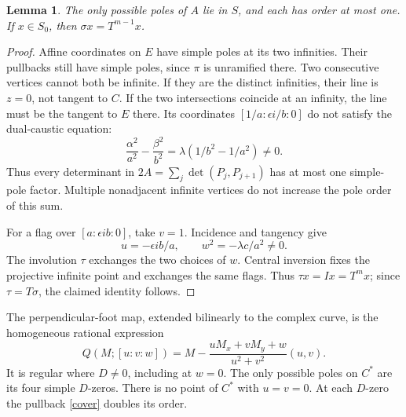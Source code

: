 \documentclass[11pt]{article}
\newtheorem{lemma}{Lemma}
\begin{document}
\begin{lemma}\label{polesA}
The only possible poles of \(A\) lie in \(S\), and each has order at
most one. If \(x\in S_0\), then
\(\sigma x=T^{m-1}x\).
\end{lemma}
\begin{proof}
Affine coordinates on \(E\) have simple poles at its two infinities.
Their pullbacks still have simple poles, since \(\pi\) is unramified
there. Two consecutive vertices cannot both be infinite. If they
are the distinct infinities, their line is \(z=0\), not tangent to \(C\).
If the two intersections coincide at an infinity, the line must be
the tangent to \(E\) there. Its coordinates
\([1/a:\epsilon i/b:0]\) do not satisfy the dual-caustic equation:
\[
 \frac{\alpha^2}{a^2}-\frac{\beta^2}{b^2}
 =\lambda(1/b^2-1/a^2)\ne0.
\]
Thus every determinant in \(2A=\sum_j\det(P_j,P_{j+1})\)
has at most one simple-pole factor. Multiple nonadjacent infinite
vertices do not increase the pole order of this sum.

For a flag over \([a:\epsilon ib:0]\), take \(v=1\).
Incidence and tangency give
\[
 u=-\epsilon ib/a,\qquad w^2=-\lambda c/a^2\ne0 .
\]
The involution \(\tau\) exchanges the two choices of \(w\).
Central inversion fixes the projective infinite point and exchanges
the same flags. Thus \(\tau x=Ix=T^mx\);
since \(\tau=T\sigma\), the claimed identity follows.
\end{proof}

The perpendicular-foot map, extended bilinearly to the complex curve,
is the homogeneous rational expression
\begin{equation}\label{foot}
 Q(M;[u:v:w])
 =M-\frac{uM_x+vM_y+w}{u^2+v^2}(u,v).
\end{equation}
It is regular where \(D\ne0\), including at \(w=0\).
The only possible poles on \(C^*\) are its four simple \(D\)-zeros.
There is no point of \(C^*\) with \(u=v=0\).
At each \(D\)-zero the pullback \eqref{cover} doubles its order.
\end{document}
